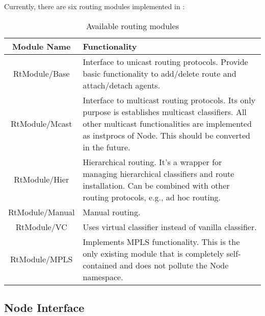 Currently, there are six routing modules implemented in \ns:
\begin{table}[htbp]
  \begin{center}
    \begin{tabular}[htbp]{|c|p{5in}|}
      \hline
      Module Name & Functionality \\ 
      \hline \hline
      RtModule/Base & Interface to unicast routing protocols. Provide
        basic functionality to add/delete route and attach/detach
        agents. \\ \hline
      RtModule/Mcast & Interface to multicast routing protocols. Its
        only purpose is establishes multicast classifiers. All other
        multicast functionalities are implemented as instprocs of
        Node. This should be converted in the future. \\ \hline
      RtModule/Hier & Hierarchical routing. It's a wrapper for
        managing hierarchical classifiers and route installation. Can
        be combined with other routing protocols, e.g., ad hoc
        routing. \\ \hline
      RtModule/Manual & Manual routing. \\ \hline
      RtModule/VC & Uses virtual classifier instead of vanilla
        classifier. \\ \hline
      RtModule/MPLS & Implements MPLS functionality. This is the only
        existing module that is completely self-contained and does not
        pollute the Node namespace. \\
      \hline
    \end{tabular}
    \caption{Available routing modules}
    \label{tab:node:rtmodule}
  \end{center}
\end{table}

\subsection{Node Interface}

